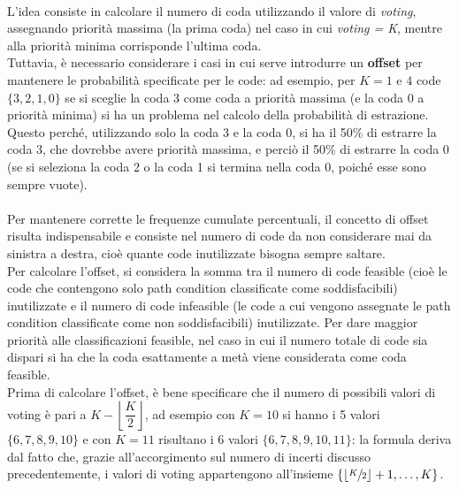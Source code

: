 \documentclass[a4paper, 12pt, oneside]{book}
\theoremstyle{normal}
\begin{document}
\\ L'idea consiste in calcolare il numero di coda utilizzando il valore di \emph{voting}, assegnando priorità massima (la prima coda) nel caso in cui \emph{voting = K}, mentre alla priorità minima corrisponde l'ultima coda. 
\\ Tuttavia, è necessario considerare i casi in cui serve introdurre un \textbf{offset} per mantenere le probabilità specificate per le code: ad esempio, per $K = 1$ e $4$ code $\{3, 2, 1, 0 \}$ se si sceglie la coda 3 come coda a priorità massima (e la coda 0 a priorità minima) si ha un problema nel calcolo della probabilità di estrazione. \\ Questo perché, utilizzando solo la coda 3 e la coda 0, si ha il 50\% di estrarre la coda 3, che dovrebbe avere priorità massima, e perciò il 50\% di estrarre la coda 0 (se si seleziona la coda 2 o la coda 1 si termina nella coda 0, poiché esse sono sempre vuote). \\ \\ Per mantenere corrette le frequenze cumulate percentuali, il concetto di offset risulta indispensabile e consiste nel numero di code da non considerare mai da sinistra a destra, cioè quante code inutilizzate bisogna sempre saltare.
\\ Per calcolare l'offset, si considera la somma tra il numero di code feasible (cioè le code che contengono solo path condition classificate come soddisfacibili) inutilizzate e il numero di code infeasible (le code a cui vengono assegnate le path condition classificate come non soddisfacibili) inutilizzate. Per dare maggior priorità alle classificazioni feasible, nel caso in cui il numero totale di code sia dispari si ha che la coda esattamente a metà viene considerata come coda feasible. \\ Prima di calcolare l'offset, è bene specificare che il numero di possibili valori di voting è pari a $K - \left\lfloor \dfrac{K}{2} \right\rfloor$, ad esempio con $K = 10$ si hanno i 5 valori $\{6,7,8,9,10\}$ e con $K = 11$ risultano i 6 valori $\{6,7,8,9,10,11\}$: la formula deriva dal fatto che, grazie all'accorgimento sul numero di incerti discusso precedentemente, i valori di voting appartengono all'insieme $\{ \left\lfloor \sfrac{K}{2} \right\rfloor + 1, \ldots, K \}$.
\end{document}
